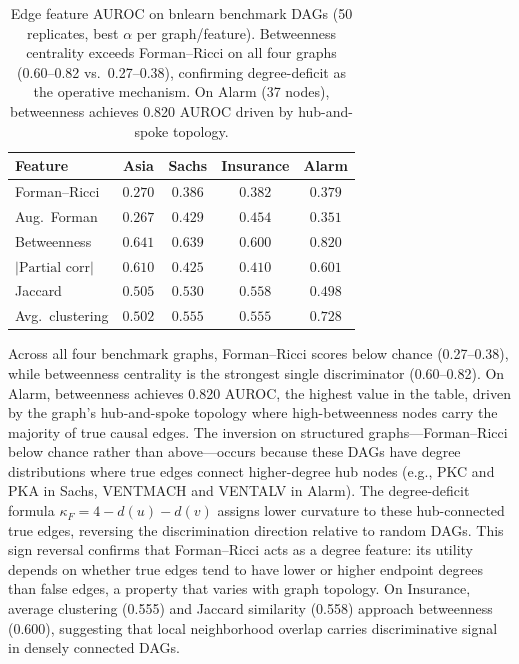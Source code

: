 \documentclass[11pt]{article}
\begin{document}
\begin{table}[t]
\centering
\caption{Edge feature AUROC on bnlearn benchmark DAGs (50 replicates, best $\alpha$ per graph/feature). Betweenness centrality exceeds Forman--Ricci on all four graphs (0.60--0.82 vs.\ 0.27--0.38), confirming degree-deficit as the operative mechanism. On Alarm (37 nodes), betweenness achieves 0.820 AUROC driven by hub-and-spoke topology.}
\label{tab:bnlearn}
\small
\begin{tabular}{@{}lcccc@{}}
\toprule
\textbf{Feature} & \textbf{Asia} & \textbf{Sachs} & \textbf{Insurance} & \textbf{Alarm} \\
\midrule
Forman--Ricci & $0.270$ & $0.386$ & $0.382$ & $0.379$ \\
Aug.\ Forman & $0.267$ & $0.429$ & $0.454$ & $0.351$ \\
Betweenness & $\mathbf{0.641}$ & $\mathbf{0.639}$ & $\mathbf{0.600}$ & $\mathbf{0.820}$ \\
$|\text{Partial corr}|$ & $0.610$ & $0.425$ & $0.410$ & $0.601$ \\
Jaccard & $0.505$ & $0.530$ & $0.558$ & $0.498$ \\
Avg.\ clustering & $0.502$ & $0.555$ & $0.555$ & $0.728$ \\
\bottomrule
\end{tabular}
\end{table}

Across all four benchmark graphs, Forman--Ricci scores below chance (0.27--0.38), while betweenness centrality is the strongest single discriminator (0.60--0.82). On Alarm, betweenness achieves 0.820 AUROC, the highest value in the table, driven by the graph's hub-and-spoke topology where high-betweenness nodes carry the majority of true causal edges. The inversion on structured graphs---Forman--Ricci below chance rather than above---occurs because these DAGs have degree distributions where true edges connect higher-degree hub nodes (e.g., PKC and PKA in Sachs, VENTMACH and VENTALV in Alarm). The degree-deficit formula $\kappa_F = 4 - d(u) - d(v)$ assigns lower curvature to these hub-connected true edges, reversing the discrimination direction relative to random DAGs. This sign reversal confirms that Forman--Ricci acts as a degree feature: its utility depends on whether true edges tend to have lower or higher endpoint degrees than false edges, a property that varies with graph topology. On Insurance, average clustering (0.555) and Jaccard similarity (0.558) approach betweenness (0.600), suggesting that local neighborhood overlap carries discriminative signal in densely connected DAGs.
\end{document}
